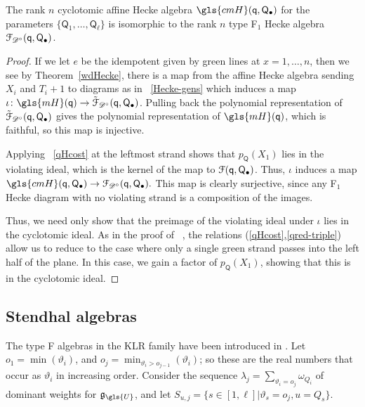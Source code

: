\documentclass[ALCO,ThmDefs,Unicode,epreuves]{cedram}
\newcommand{\pq}{\mathsf{q}}
\newcommand{\la}{\lambda}
\newcommand{\PQ}{\mathsf{Q}}
\begin{document}
\begin{prop}\label{prop:cyclo-Hecke}
 The rank $n$ cyclotomic affine Hecke algebra $\gls{cmH}(\pq,\PQ_\bullet)$ for the parameters $\{\PQ_1,\dots,
 \PQ_\ell\}$ is isomorphic to the rank $n$ type F$_1$ Hecke algebra
 $\EuScript{F}_{\mathscr{D}^\circ} (\pq,\PQ_{\bullet})$.
\end{prop}
\begin{proof}
 If we let $e$ be the idempotent given by green lines at $x=1,\dots, 
 n$, then we see by Theorem~\ref{wdHecke}, there is a map from the
 affine Hecke algebra sending $X_i$ and $T_i+1$ to diagrams as in
~\eqref{Hecke-gens} which induces a map
 $\iota\colon \gls{mH}(\pq)\to \EuScript{\tilde F}_{\mathscr{D}^\circ}
 (\pq,\PQ_{\bullet})$. 
Pulling back the polynomial representation of $\EuScript{\tilde F}_{\mathscr{D}^\circ}
 (\pq,\PQ_{\bullet})$ gives the polynomial representation of
 $\gls{mH}(\pq)$, which is faithful, so this map is injective.

 Applying 
~\eqref{qHcost} at the leftmost strand shows that $p_\PQ(X_1)$ lies
 in the violating ideal, which is the kernel of the map to
 $\EuScript{F}(\pq,\PQ_{\bullet})$. Thus, $\iota$ induces a
 map $\gls{cmH}(\pq,\PQ_\bullet)\to \EuScript{F}_{\mathscr{D}^\circ}
 (\pq,\PQ_{\bullet}). $ This map is clearly surjective, since any
 F$_1$ Hecke diagram with no violating strand is a composition of the
 images.
 
 Thus, we need only show that the preimage of
 the violating ideal under $\iota$ lies in the cyclotomic ideal. As in the proof of
~\cite[3.16]{Webmerged}, the relations (\ref{qHcost},\ref{qred-triple})
 allow us to reduce to the case where only a single green strand
 passes into the left half of the plane. In this case, we gain a
 factor of $p_\PQ(X_1)$, showing that this is in the cyclotomic
 ideal. 
\end{proof}

\subsection{Stendhal algebras}
\label{sec:stendhal-algebras}


The type F algebras in the KLR family have been introduced in
\cite{Webmerged}. 
Let $o_1=\min(\vartheta_i)$, and
$o_j=\min_{\vartheta_i>o_{j-1}}(\vartheta_i)$; so these are the real
numbers that occur as $\vartheta_i$ in increasing order.
Consider the sequence $\la_j=\sum_{\vartheta_i=o_j}\omega_{Q_i}$ of
dominant weights for $\mathfrak{g}_{\gls{U}}$, and let $S_{u,j}=\{s\in
[1,\ell]|\vartheta_s=o_j, u=Q_s\}$.
\end{document}
